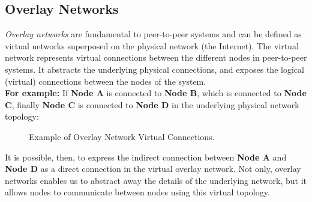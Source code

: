 \documentclass[12pt, titlepage]{uo_temp}
\begin{document}
   
     \subsection{Overlay Networks}\label{bkg_overlay}
     \emph{Overlay networks} are fundamental to peer-to-peer systems and can be defined as
     virtual networks superposed on the physical network (the Internet).  The virtual
     network represents virtual connections between the different nodes in peer-to-peer
     systems.  It abstracts the underlying physical connections, and exposes the logical
     (virtual) connections between the nodes of the system.\\

     \textbf{For example:} 
     If \textbf{Node A} is connected to \textbf{Node B}, which is
     connected to \textbf{Node C}, finally \textbf{Node C} is connected to \textbf{Node D}
     in the underlying physical network topology:

     \begin{figure}[h]
       \centering
       \caption{Example of Overlay Network Virtual Connections.}
     \end{figure}

     It is possible, then, to express the indirect connection between \textbf{Node A} and
     \textbf{Node D} as a direct connection in the virtual overlay network. Not only,
     overlay networks enables us to abstract away the details of the underlying network,
     but it allows nodes to communicate between nodes using this virtual topology.  
\end{document}
